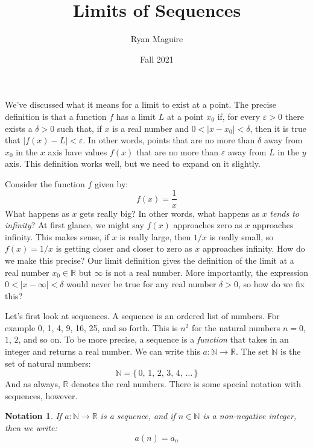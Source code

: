 \documentclass{article}
\title{Limits of Sequences}
\author{Ryan Maguire}
\date{Fall 2021}
\theoremstyle{normal}
\newtheorem{notation}{Notation}
\theoremstyle{plain}
\begin{document}
    \maketitle
    We've discussed what it means for a limit to exist at a point. The precise
    definition is that a function $f$ has a limit $L$ at a point $x_{0}$ if,
    for every $\varepsilon>0$ there exists a $\delta>0$ such that, if $x$ is a
    real number and $0<|x-x_{0}|<\delta$, then it is true that
    $|f(x)-L|<\varepsilon$. In other words, points that are no more than
    $\delta$ away from $x_{0}$ in the $x$ axis have values $f(x)$ that are no
    more than $\varepsilon$ away from $L$ in the $y$ axis. This definition
    works well, but we need to expand on it slightly.
    \par\hfill\par
    Consider the function $f$ given by:
    \begin{equation}
        f(x)=\frac{1}{x}
    \end{equation}
    What happens as $x$ gets really big? In other words, what happens as
    $x$ \textit{tends to infinity}? At first glance, we might say $f(x)$
    approaches zero as $x$ approaches infinity. This makes sense, if $x$ is
    really large, then $1/x$ is really small, so $f(x)=1/x$ is getting closer
    and closer to zero as $x$ approaches infinity. How do we make this precise?
    Our limit definition gives the definition of the limit at a real number
    $x_{0}\in\mathbb{R}$ but $\infty$ is not a real number. More importantly,
    the expression $0<|x-\infty|<\delta$ would never be true for any real
    number $\delta>0$, so how do we fix this?
    \par\hfill\par
    Let's first look at sequences. A sequence is an ordered list of numbers.
    For example 0, 1, 4, 9, 16, 25, and so forth. This is $n^{2}$ for the
    natural numbers $n=0$, $1$, $2$, and so on. To be more precise, a sequence
    is a \textit{function} that takes in an integer and returns a real number.
    We can write this $a:\mathbb{N}\rightarrow\mathbb{R}$. The set
    $\mathbb{N}$ is the set of natural numbers:
    \begin{equation}
        \mathbb{N}=\{\,0,\,1,\,2,\,3,\,4,\,\dots\,\}
    \end{equation}
    And as always, $\mathbb{R}$ denotes the real numbers. There is some special
    notation with sequences, however.
    \begin{notation}
        If $a:\mathbb{N}\rightarrow\mathbb{R}$ is a sequence, and if
        $n\in\mathbb{N}$ is a non-negative integer, then we write:
        \begin{equation}
            a(n)=a_{n}
        \end{equation}
    \end{notation}
\end{document}
